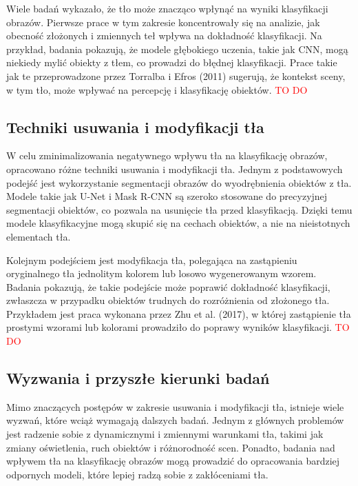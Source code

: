 Wiele badań wykazało, że tło może znacząco wpłynąć na wyniki klasyfikacji obrazów. Pierwsze prace w 
tym zakresie koncentrowały się na analizie, jak obecność złożonych i zmiennych teł wpływa na 
dokładność klasyfikacji. Na przykład, badania pokazują, że modele głębokiego uczenia, takie jak CNN, 
mogą niekiedy mylić obiekty z tłem, co prowadzi do błędnej klasyfikacji. Prace takie jak te 
przeprowadzone przez Torralba i Efros (2011) sugerują, że kontekst sceny, w tym tło, może wpływać na 
percepcję i klasyfikację obiektów.
\textcolor{red}{TO DO}

\subsection*{Techniki usuwania i modyfikacji tła}

W celu zminimalizowania negatywnego wpływu tła na klasyfikację obrazów, opracowano różne techniki 
usuwania i modyfikacji tła. Jednym z podstawowych podejść jest wykorzystanie segmentacji obrazów do 
wyodrębnienia obiektów z tła. Modele takie jak U-Net i Mask R-CNN są szeroko stosowane do precyzyjnej 
segmentacji obiektów, co pozwala na usunięcie tła przed klasyfikacją. Dzięki temu modele 
klasyfikacyjne mogą skupić się na cechach obiektów, a nie na nieistotnych elementach tła.

Kolejnym podejściem jest modyfikacja tła, polegająca na zastąpieniu oryginalnego tła jednolitym 
kolorem lub losowo wygenerowanym wzorem. Badania pokazują, że takie podejście może poprawić dokładność 
klasyfikacji, zwłaszcza w przypadku obiektów trudnych do rozróżnienia od złożonego tła. Przykładem 
jest praca wykonana przez Zhu et al. (2017), w której zastąpienie tła prostymi wzorami lub kolorami 
prowadziło do poprawy wyników klasyfikacji.
\textcolor{red}{TO DO}

\subsection*{Wyzwania i przyszłe kierunki badań}

Mimo znaczących postępów w zakresie usuwania i modyfikacji tła, istnieje wiele wyzwań, które wciąż 
wymagają dalszych badań. Jednym z głównych problemów jest radzenie sobie z dynamicznymi i zmiennymi 
warunkami tła, takimi jak zmiany oświetlenia, ruch obiektów i różnorodność scen. Ponadto, badania nad 
wpływem tła na klasyfikację obrazów mogą prowadzić do opracowania bardziej odpornych modeli, które 
lepiej radzą sobie z zakłóceniami tła.

